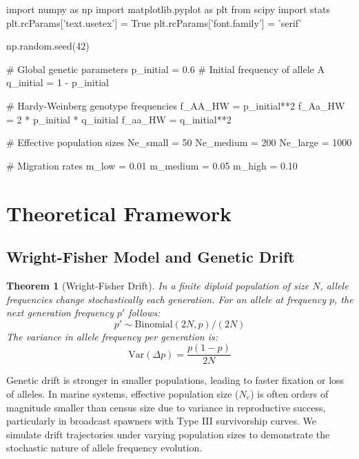 \documentclass[11pt,a4paper]{article}
\newtheorem{theorem}{Theorem}[section]
\begin{document}
\begin{pycode}
import numpy as np
import matplotlib.pyplot as plt
from scipy import stats
plt.rcParams['text.usetex'] = True
plt.rcParams['font.family'] = 'serif'

np.random.seed(42)

# Global genetic parameters
p_initial = 0.6  # Initial frequency of allele A
q_initial = 1 - p_initial

# Hardy-Weinberg genotype frequencies
f_AA_HW = p_initial**2
f_Aa_HW = 2 * p_initial * q_initial
f_aa_HW = q_initial**2

# Effective population sizes
Ne_small = 50
Ne_medium = 200
Ne_large = 1000

# Migration rates
m_low = 0.01
m_medium = 0.05
m_high = 0.10
\end{pycode}

\section{Theoretical Framework}

\subsection{Wright-Fisher Model and Genetic Drift}

\begin{theorem}[Wright-Fisher Drift]
In a finite diploid population of size $N$, allele frequencies change stochastically each generation.
For an allele at frequency $p$, the next generation frequency $p'$ follows:
\begin{equation}
p' \sim \text{Binomial}(2N, p) / (2N)
\end{equation}
The variance in allele frequency per generation is:
\begin{equation}
\text{Var}(\Delta p) = \frac{p(1-p)}{2N}
\end{equation}
\end{theorem}

Genetic drift is stronger in smaller populations, leading to faster fixation or loss of alleles.
In marine systems, effective population size ($N_e$) is often orders of magnitude smaller than
census size due to variance in reproductive success, particularly in broadcast spawners with
Type III survivorship curves. We simulate drift trajectories under varying population sizes to
demonstrate the stochastic nature of allele frequency evolution.
\end{document}

